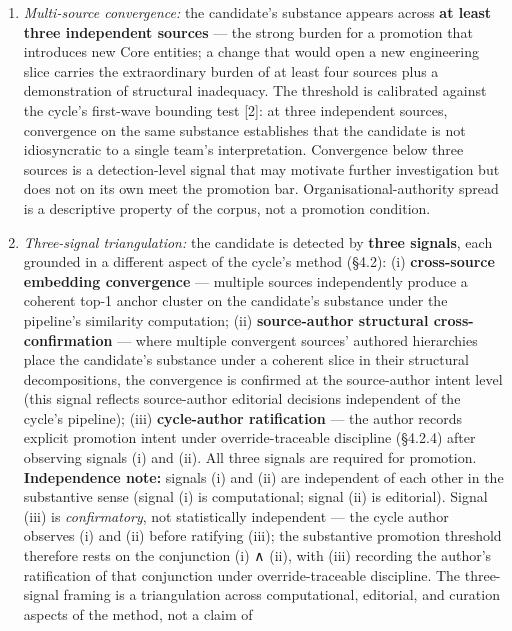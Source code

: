 \documentclass[
]{article}
\providecommand{\tightlist}{%
  \setlength{\itemsep}{0pt}\setlength{\parskip}{0pt}}
\begin{document}
\begin{enumerate}
\def\labelenumi{\arabic{enumi}.}
\tightlist
\item
  \emph{Multi-source convergence:} the candidate's substance appears
  across \textbf{at least three independent sources} --- the strong
  burden for a promotion that introduces new Core entities; a change
  that would open a new engineering slice carries the extraordinary
  burden of at least four sources plus a demonstration of structural
  inadequacy. The threshold is calibrated against the cycle's first-wave
  bounding test {[}2{]}: at three independent sources, convergence on
  the same substance establishes that the candidate is not idiosyncratic
  to a single team's interpretation. Convergence below three sources is
  a detection-level signal that may motivate further investigation but
  does not on its own meet the promotion bar. Organisational-authority
  spread is a descriptive property of the corpus, not a promotion
  condition.
\item
  \emph{Three-signal triangulation:} the candidate is detected by
  \textbf{three signals}, each grounded in a different aspect of the
  cycle's method (§4.2): (i) \textbf{cross-source embedding convergence}
  --- multiple sources independently produce a coherent top-1 anchor
  cluster on the candidate's substance under the pipeline's similarity
  computation; (ii) \textbf{source-author structural cross-confirmation}
  --- where multiple convergent sources' authored hierarchies place the
  candidate's substance under a coherent slice in their structural
  decompositions, the convergence is confirmed at the source-author
  intent level (this signal reflects source-author editorial decisions
  independent of the cycle's pipeline); (iii) \textbf{cycle-author
  ratification} --- the author records explicit promotion intent under
  override-traceable discipline (§4.2.4) after observing signals (i) and
  (ii). All three signals are required for promotion.
  \textbf{Independence note:} signals (i) and (ii) are independent of
  each other in the substantive sense (signal (i) is computational;
  signal (ii) is editorial). Signal (iii) is \emph{confirmatory}, not
  statistically independent --- the cycle author observes (i) and (ii)
  before ratifying (iii); the substantive promotion threshold therefore
  rests on the conjunction (i) ∧ (ii), with (iii) recording the author's
  ratification of that conjunction under override-traceable discipline.
  The three-signal framing is a triangulation across computational,
  editorial, and curation aspects of the method, not a claim of

\end{enumerate}
\end{document}
